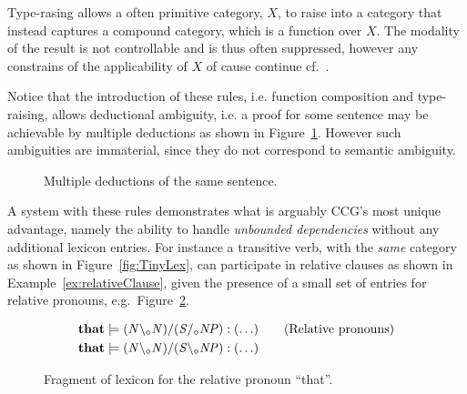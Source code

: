 Type-rasing allows a often primitive category, $X$, to raise into a category that instead captures a compound category, which is a function over $X$. The modality of the result is not controllable and is thus often suppressed, however any constrains of the applicability of $X$ of cause continue cf.\ \cite{multiModalCCG}.

Notice that the introduction of these rules, i.e. function composition and type-raising, allows deductional ambiguity, i.e. a proof for some sentence may be achievable by multiple deductions as shown in Figure~\ref{fig:multipleDeductions}. However such ambiguities are immaterial, since they do not correspond to semantic ambiguity.

\begin{figure}[ht]
\vspace{1em}
\begin{minipage}[b]{0.5\linewidth}
\center
{}
\end{minipage}
\hfill
\begin{minipage}[b]{0.5\linewidth}
\center
{}
\end{minipage}
  \caption{Multiple deductions of the same sentence.}
  \label{fig:multipleDeductions}
  \vspace{1em}
\end{figure}


A system with these rules demonstrates what is arguably CCG's most unique advantage, namely the ability to handle \emph{unbounded dependencies} without any additional lexicon entries. For instance a transitive verb, with the \emph{same} category as shown in Figure~\ref{fig:TinyLex}, can participate in relative clauses as shown in Example~\ref{ex:relativeClause}, given the presence of a small set of entries for relative pronouns, e.g.\ Figure~\ref{fig:tinyLex2}.

\begin{figure}[ht]
\begin{align*}
  \mathbf{that}       &\models ({\mathit{N}} \backslash_\diamond {\mathit{N}})/({\mathit{S}}/_\diamond{\mathit{NP}})    : (\ldots)    \tag{Relative pronouns}   \\
  \mathbf{that}       &\models ({\mathit{N}} \backslash_\diamond {\mathit{N}})/({\mathit{S}}\backslash_\diamond{\mathit{NP}})    : (\ldots)    
\end{align*}
\caption{Fragment of lexicon for the relative pronoun ``that''.}
\label{fig:tinyLex2}
\end{figure}


